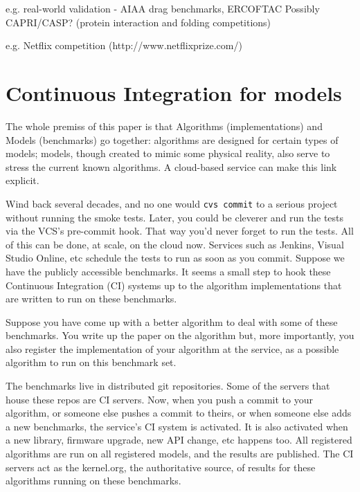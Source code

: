 \documentclass[conference]{IEEEtran}
\begin{document}
e.g. real-world validation - AIAA drag benchmarks, ERCOFTAC
	Possibly CAPRI/CASP? (protein interaction and folding competitions)

e.g. Netflix competition (http://www.netflixprize.com/)



\section{Continuous Integration for models}


The whole premiss of this paper is that Algorithms (implementations)
and Models (benchmarks) go together: algorithms are designed for
certain types of models; models, though created to mimic some physical
reality, also serve to stress the current known algorithms. A
cloud-based service can make this link explicit.

Wind back several decades, and no one would {\texttt{cvs commit}} to a
serious project without running the smoke tests. Later, you could be
cleverer and run the tests via the VCS's pre-commit hook. That way
you'd never forget to run the tests. All of this can be done, at
scale, on the cloud now. Services such as Jenkins, Visual Studio
Online, etc schedule the tests to run as soon as you commit. Suppose
we have the publicly accessible benchmarks. It seems a small step to
hook these Continuous Integration (CI) systems up to the algorithm
implementations that are written to run on these benchmarks.

Suppose you have come up with a better algorithm to deal with some of
these benchmarks. You write up the paper on the algorithm but, more
importantly, you also register the implementation of your algorithm at
the service, as a possible algorithm to run on this benchmark set.

The benchmarks live in distributed git repositories. Some of the
servers that house these repos are CI servers. Now, when you push a
commit to your algorithm, or someone else pushes a commit to theirs,
or when someone else adds a new benchmarks, the service's CI system is
activated. It is also activated when a new library, firmware upgrade,
new API change, etc happens too. All registered algorithms are run on
all registered models, and the results are published. The CI servers
act as the kernel.org, the authoritative source, of results for these
algorithms running on these benchmarks.
\end{document}
